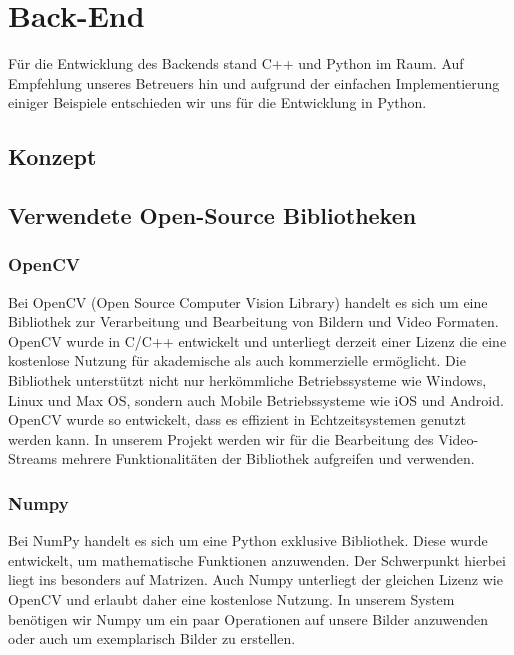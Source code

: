 \chapter{Back-End}
Für die Entwicklung des Backends stand C++ und Python im Raum. Auf Empfehlung unseres Betreuers hin und aufgrund der einfachen Implementierung einiger Beispiele entschieden wir uns
für die Entwicklung in Python.
\section{Konzept}
\section{Verwendete Open-Source Bibliotheken}
\subsection{OpenCV}
Bei OpenCV (Open Source Computer Vision Library) handelt es sich um eine Bibliothek zur Verarbeitung und Bearbeitung von Bildern und Video Formaten.  OpenCV wurde in C/C++ entwickelt und unterliegt derzeit einer Lizenz die eine kostenlose Nutzung für akademische als auch kommerzielle ermöglicht. Die Bibliothek unterstützt nicht nur herkömmliche Betriebssysteme wie Windows, Linux und Max OS, sondern auch Mobile Betriebssysteme wie iOS und Android. OpenCV wurde so entwickelt, dass es effizient in Echtzeitsystemen genutzt werden kann. In unserem Projekt werden wir für die Bearbeitung des Video-Streams mehrere Funktionalitäten der Bibliothek aufgreifen und verwenden.
\subsection{Numpy}
Bei NumPy handelt es sich um eine Python exklusive Bibliothek. Diese wurde entwickelt, um mathematische Funktionen anzuwenden. Der Schwerpunkt hierbei liegt ins besonders auf Matrizen. Auch Numpy unterliegt der gleichen Lizenz wie OpenCV und erlaubt daher eine kostenlose Nutzung. In unserem System benötigen wir Numpy um ein paar Operationen auf unsere Bilder anzuwenden oder auch um exemplarisch Bilder zu erstellen.
